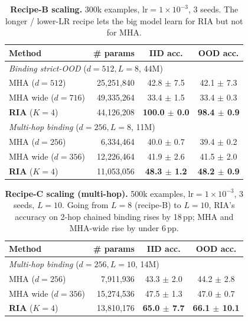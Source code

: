 \documentclass{article}
\begin{document}
\begin{table}[h]
\centering
\caption{\textbf{Recipe-B scaling.} 300k examples,
$\mathrm{lr}{=}1\!\times\!10^{-3}$, 3 seeds. The longer / lower-LR
recipe lets the big model learn for RIA but not for MHA.}
\label{tab:scaling-B}
\begin{tabular}{lrcc}
\toprule
Method & \# params & IID acc. & OOD acc. \\
\midrule
\multicolumn{4}{l}{\textit{Binding strict-OOD} ($d{=}512, L{=}8$, 44M)} \\
\hspace{1em} MHA ($d{=}512$)            & 25,251,840 & 42.8 $\pm$ 7.5 & 42.1 $\pm$ 7.3 \\
\hspace{1em} MHA wide ($d{=}716$)       & 49,335,264 & 33.4 $\pm$ 1.5 & 33.4 $\pm$ 0.3 \\
\hspace{1em} \textbf{RIA} ($K{=}4$)     & 44,126,208 & \textbf{100.0 $\pm$ 0.0} & \textbf{98.4 $\pm$ 0.9} \\
\midrule
\multicolumn{4}{l}{\textit{Multi-hop binding} ($d{=}256, L{=}8$, 11M)} \\
\hspace{1em} MHA ($d{=}256$)            & 6,334,464 & 40.0 $\pm$ 0.7 & 39.4 $\pm$ 0.2 \\
\hspace{1em} MHA wide ($d{=}356$)       & 12,226,464 & 41.9 $\pm$ 2.6 & 41.5 $\pm$ 2.0 \\
\hspace{1em} \textbf{RIA} ($K{=}4$)     & 11,053,056 & \textbf{48.3 $\pm$ 1.2} & \textbf{48.2 $\pm$ 0.9} \\
\bottomrule
\end{tabular}
\end{table}

\begin{table}[h]
\centering
\caption{\textbf{Recipe-C scaling (multi-hop).} 500k examples,
$\mathrm{lr}{=}1\!\times\!10^{-3}$, 3 seeds, $L{=}10$.
Going from $L{=}8$ (recipe-B) to $L{=}10$, RIA's accuracy on
2-hop chained binding rises by 18\,pp; MHA and MHA-wide rise by
under 6\,pp.}
\label{tab:scaling-C}
\begin{tabular}{lrcc}
\toprule
Method & \# params & IID acc. & OOD acc. \\
\midrule
\multicolumn{4}{l}{\textit{Multi-hop binding} ($d{=}256, L{=}10$, 14M)} \\
\hspace{1em} MHA ($d{=}256$)            &  7,911,936 & 43.3 $\pm$ 2.0 & 44.2 $\pm$ 2.8 \\
\hspace{1em} MHA wide ($d{=}356$)       & 15,274,536 & 47.5 $\pm$ 1.3 & 47.0 $\pm$ 0.7 \\
\hspace{1em} \textbf{RIA} ($K{=}4$)     & 13,810,176 & \textbf{65.0 $\pm$ 7.7} & \textbf{66.1 $\pm$ 10.1} \\
\bottomrule
\end{tabular}
\end{table}
\end{document}
